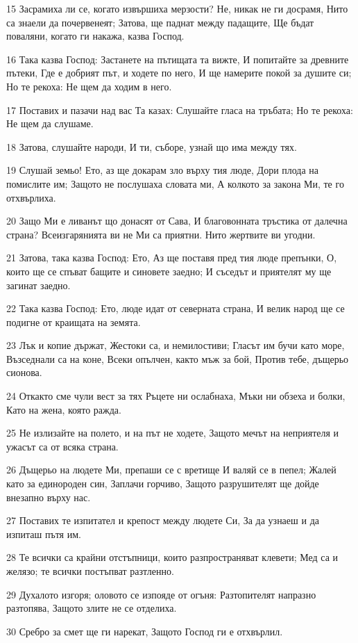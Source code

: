 \par 15 Засрамиха ли се, когато извършиха мерзости? Не, никак не ги досрамя, Нито са знаели да почервенеят; Затова, ще паднат между падащите, Ще бъдат поваляни, когато ги накажа, казва Господ.
\par 16 Така казва Господ: Застанете на пътищата та вижте, И попитайте за древните пътеки, Где е добрият път, и ходете по него, И ще намерите покой за душите си; Но те рекоха: Не щем да ходим в него.
\par 17 Поставих и пазачи над вас Та казах: Слушайте гласа на тръбата; Но те рекоха: Не щем да слушаме.
\par 18 Затова, слушайте народи, И ти, съборе, узнай що има между тях.
\par 19 Слушай земьо! Ето, аз ще докарам зло върху тия люде, Дори плода на помислите им; Защото не послушаха словата ми, А колкото за закона Ми, те го отхвърлиха.
\par 20 Защо Ми е ливанът що донасят от Сава, И благовонната тръстика от далечна страна? Всеизгарянията ви не Ми са приятни. Нито жертвите ви угодни.
\par 21 Затова, така казва Господ: Ето, Аз ще поставя пред тия люде препънки, О, които ще се спъват бащите и синовете заедно; И съседът и приятелят му ще загинат заедно.
\par 22 Така казва Господ: Ето, люде идат от северната страна, И велик народ ще се подигне от краищата на земята.
\par 23 Лък и копие държат, Жестоки са, и немилостиви; Гласът им бучи като море, Възседнали са на коне, Всеки опълчен, както мъж за бой, Против тебе, дъщерьо сионова.
\par 24 Откакто сме чули вест за тях Ръцете ни ослабнаха, Мъки ни обзеха и болки, Като на жена, която ражда.
\par 25 Не излизайте на полето, и на път не ходете, Защото мечът на неприятеля и ужасът са от всяка страна.
\par 26 Дъщерьо на людете Ми, препаши се с вретище И валяй се в пепел; Жалей като за единороден син, Заплачи горчиво, Защото разрушителят ще дойде внезапно върху нас.
\par 27 Поставих те изпитател и крепост между людете Си, За да узнаеш и да изпиташ пътя им.
\par 28 Те всички са крайни отстъпници, които разпространяват клевети; Мед са и желязо; те всички постъпват разтленно.
\par 29 Духалото изгоря; оловото се изпояде от огъня: Разтопителят напразно разтопява, Защото злите не се отделиха.
\par 30 Сребро за смет ще ги нарекат, Защото Господ ги е отхвърлил.

